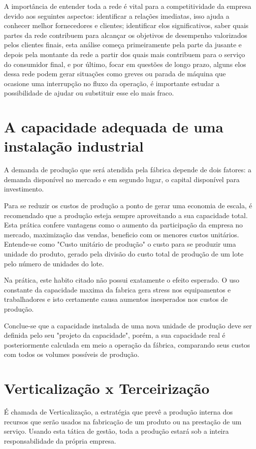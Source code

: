 \par A importância de entender toda a rede é vital para a competitividade da empresa devido aos seguintes aspectos: identificar a relações imediatas, isso ajuda a conhecer melhor fornecedores e clientes; identificar elos significativos, saber quais partes da rede contribuem para alcançar os objetivos de desempenho valorizados pelos clientes finais, esta análise começa primeiramente pela parte da jusante e depois pela montante da rede a partir dos quais mais contribuem para o serviço do consumidor final, e por último, focar em questões de longo prazo, alguns elos dessa rede podem gerar situações como greves ou parada de máquina que ocasione uma interrupção no fluxo da operação, é importante estudar a possibilidade de ajudar ou substituir esse elo mais fraco.

\section{A capacidade adequada de uma instalação industrial}
A demanda de produção que será atendida pela fábrica depende de dois fatores: a demanda disponível no mercado e em segundo lugar, o capital disponível para investimento. 

Para se reduzir os custos de produção a ponto de gerar uma economia de escala, é recomendado que a produção esteja sempre aproveitando a sua capacidade total. Esta prática confere vantagens como o aumento da participação da empresa no mercado, maximização das vendas, beneficio com os menores custos unitários. Entende-se como "Custo unitário de produção"  o custo para se produzir uma unidade do produto, gerado pela divisão do custo total de produção de um lote pelo número de unidades do lote.

Na prática, este habito citado não possui exatamente o efeito esperado. O uso constante da capacidade maxima da fabrica gera stress nos equipamentos e trabalhadores e isto certamente causa aumentos inesperados nos custos de produção.

Conclue-se que a capacidade instalada de uma nova unidade de produção deve ser definida pelo seu "projeto da capacidade", porém, a sua capacidade real é posteriormente calculada em meio a operação da fábrica, comparando seus custos com todos os volumes possíveis de produção. 

\section{Verticalização x Terceirização}
É chamada de Verticalização, a estratégia que prevê a produção interna dos recursos que serão usados na fabricação de um produto ou na prestação de um serviço. Usando esta tática de gestão, toda a produção estará sob a inteira responsabilidade da própria empresa.


